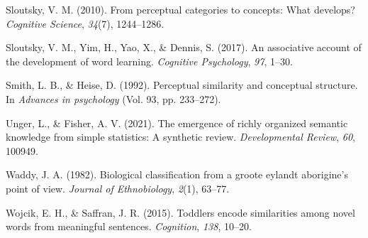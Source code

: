 \documentclass[english,,man,floatsintext]{apa6}
\begin{document}
\leavevmode\hypertarget{ref-sloutsky2010}{}%
Sloutsky, V. M. (2010). From perceptual categories to concepts: What develops? \emph{Cognitive Science}, \emph{34}(7), 1244--1286.

\leavevmode\hypertarget{ref-sloutsky2017}{}%
Sloutsky, V. M., Yim, H., Yao, X., \& Dennis, S. (2017). An associative account of the development of word learning. \emph{Cognitive Psychology}, \emph{97}, 1--30.

\leavevmode\hypertarget{ref-smith1992}{}%
Smith, L. B., \& Heise, D. (1992). Perceptual similarity and conceptual structure. In \emph{Advances in psychology} (Vol. 93, pp. 233--272).

\leavevmode\hypertarget{ref-unger2021}{}%
Unger, L., \& Fisher, A. V. (2021). The emergence of richly organized semantic knowledge from simple statistics: A synthetic review. \emph{Developmental Review}, \emph{60}, 100949.

\leavevmode\hypertarget{ref-waddy1982}{}%
Waddy, J. A. (1982). Biological classification from a groote eylandt aborigine's point of view. \emph{Journal of Ethnobiology}, \emph{2}(1), 63--77.

\leavevmode\hypertarget{ref-wojcik2015}{}%
Wojcik, E. H., \& Saffran, J. R. (2015). Toddlers encode similarities among novel words from meaningful sentences. \emph{Cognition}, \emph{138}, 10--20.
\end{document}
